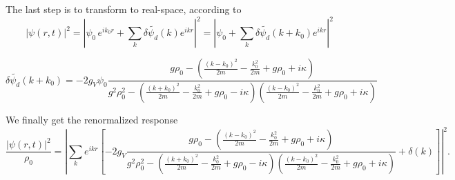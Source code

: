 \documentclass[a4paper,prb,10pt,aps]{revtex4-1}
\begin{document}
The last step is to transform to real-space, according to
\begin{equation}
  \label{eq:40}
\left|\psi(r,t)\right|^{2}=\left|\psi_{0}\, e^{ik_{0}r}+\sum_{k}\delta\widetilde{\psi_{d}}(k)e^{ikr}\right|^{2}=\left|\psi_{0}+\sum_{k}\delta\widetilde{\psi_{d}}(k+k_{0})e^{ikr}\right|^{2}  
\end{equation}

\begin{equation}
  \label{eq:41}
\delta\widetilde{\psi_{d}}(k+k_{0})=-2g_{V}\psi_{0}\frac{g\rho_{0}-\left(\frac{\left(k-k_{0}\right)^{2}}{2m}-\frac{k_{0}^{2}}{2m}+g\rho_{0}+i\kappa\right)}{g^{2}\rho_{0}^{2}-\left(\frac{\left(k+k_{0}\right)^{2}}{2m}-\frac{k_{0}^{2}}{2m}+g\rho_{0}-i\kappa\right)\left(\frac{\left(k-k_{0}\right)^{2}}{2m}-\frac{k_{0}^{2}}{2m}+g\rho_{0}+i\kappa\right)}  
\end{equation}



We finally get the renormalized response
\begin{equation}
  \label{eq:42}
\frac{\left|\psi(r,t)\right|^{2}}{\rho_{0}}=\left|\sum_{k}e^{ikr}\left[-2g_{V}\frac{g\rho_{0}-\left(\frac{\left(k-k_{0}\right)^{2}}{2m}-\frac{k_{0}^{2}}{2m}+g\rho_{0}+i\kappa\right)}{g^{2}\rho_{0}^{2}-\left(\frac{\left(k+k_{0}\right)^{2}}{2m}-\frac{k_{0}^{2}}{2m}+g\rho_{0}-i\kappa\right)\left(\frac{\left(k-k_{0}\right)^{2}}{2m}-\frac{k_{0}^{2}}{2m}+g\rho_{0}+i\kappa\right)}+\delta(k)\right]\right|^{2}.  
\end{equation}







\end{document}
